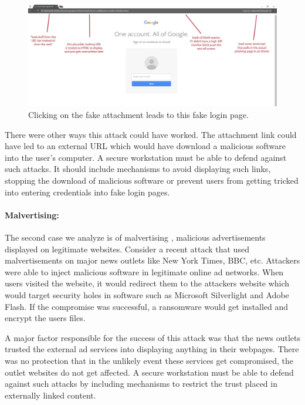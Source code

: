 \begin{figure}[p]
\centering
    \includegraphics[width=1.0\textwidth]{tomscott-gmail-login.jpg}
    \caption{Clicking on the fake attachment leads to this fake login page.}
   \label{fig:fake-attachment-login}
\end{figure}

There were other ways this attack could have worked. The attachment link could have led to an external URL which would have download a malicious software into the user's computer. A secure workstation must be able to defend against such attacks. It should include mechanisms to avoid displaying such links, stopping the download of malicious software or prevent users from getting tricked into entering credentials into fake login pages.

\paragraph{Malvertising:} The second case we analyze is of malvertising \cite{malvertising}, malicious advertisements displayed on legitimate websites. Consider a recent attack \cite{malvertisement-nytimes} that used malvertisements on major news outlets like New York Times, BBC, etc. Attackers were able to inject malicious software in legitimate online ad networks. When users visited the website, it would redirect them to the attackers website which would target security holes in software such as Microsoft Silverlight and Adobe Flash. If the compromise was successful, a ransomware would get installed and encrypt the users files.

A major factor responsible for the success of this attack was that the news outlets trusted the external ad services into displaying anything in their webpages. There was no protection that in the unlikely event these services get compromised, the outlet websites do not get affected. A secure workstation must be able to defend against such attacks by including mechanisms to restrict the trust placed in externally linked content.

